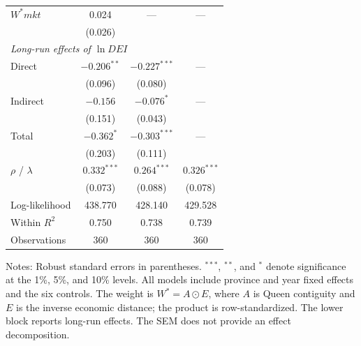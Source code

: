 \documentclass[economies,article,submit,moreauthors]{Definitions/mdpi}
\begin{document}
\begin{table}[H]
\begin{threeparttable}
\begin{tabular}{lccc}
$W^{*}mkt$ & 0.024 & --- & ---\\
 & (0.026) & & \\
\midrule
\multicolumn{4}{l}{\textit{Long-run effects of $\ln DEI$}}\\
Direct & $-0.206^{**}$ & $-0.227^{***}$ & ---\\
 & (0.096) & (0.080) & \\
Indirect & $-0.156$ & $-0.076^{*}$ & ---\\
 & (0.151) & (0.043) & \\
Total & $-0.362^{*}$ & $-0.303^{***}$ & ---\\
 & (0.203) & (0.111) & \\
\midrule
$\rho$ / $\lambda$ & $0.332^{***}$ & $0.264^{***}$ & $0.326^{***}$\\
 & (0.073) & (0.088) & (0.078)\\
Log-likelihood & 438.770 & 428.140 & 429.528\\
Within $R^2$ & 0.750 & 0.738 & 0.739\\
Observations & 360 & 360 & 360\\
\bottomrule
\end{tabular}
\begin{tablenotes}\footnotesize
\item Notes: Robust standard errors in parentheses. $^{***}$, $^{**}$, and $^{*}$ denote significance at the 1\%, 5\%, and 10\% levels. All models include province and year fixed effects and the six controls. The weight is $W^{*}=A\odot E$, where $A$ is Queen contiguity and $E$ is the inverse economic distance; the product is row-standardized. The lower block reports long-run effects. The SEM does not provide an effect decomposition.
\end{tablenotes}
\end{threeparttable}
\end{table}
\end{document}
